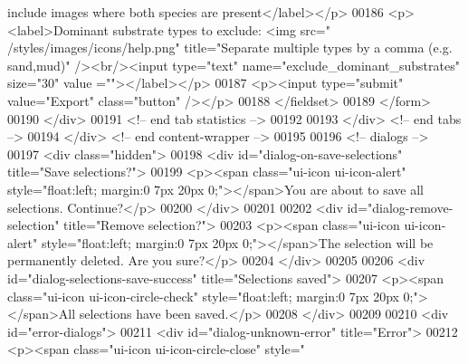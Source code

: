 \begin{DoxyCode}
      include images where both species are present</label></p>
00186                 <p><label>Dominant substrate types to exclude: <img src=\textcolor{stringliteral}{"
      /styles/images/icons/help.png"} title=\textcolor{stringliteral}{"Separate multiple types by a comma (e.g.
       sand,mud)"} /><br/><input type=\textcolor{stringliteral}{"text"} name=\textcolor{stringliteral}{"exclude\_dominant\_substrates"} size=\textcolor{stringliteral}{"30"} value
      =\textcolor{stringliteral}{""}></label></p>
00187                 <p><input type=\textcolor{stringliteral}{"submit"} value=\textcolor{stringliteral}{"Export"} \textcolor{keyword}{class}=\textcolor{stringliteral}{"button"} /></p>
00188             </fieldset>
00189             </form>
00190         </div>
00191         <!-- end tab statistics -->
00192 
00193     </div> <!-- end tabs -->
00194     </div> <!-- end content-wrapper -->
00195 
00196     <!-- dialogs -->
00197     <div \textcolor{keyword}{class}=\textcolor{stringliteral}{"hidden"}>
00198         <div \textcolor{keywordtype}{id}=\textcolor{stringliteral}{"dialog-on-save-selections"} title=\textcolor{stringliteral}{"Save selections?"}>
00199             <p><span \textcolor{keyword}{class}=\textcolor{stringliteral}{"ui-icon ui-icon-alert"} style=\textcolor{stringliteral}{"float:left; margin:0
       7px 20px 0;"}></span>You are about to save all selections. Continue?</p>
00200         </div>
00201 
00202         <div \textcolor{keywordtype}{id}=\textcolor{stringliteral}{"dialog-remove-selection"} title=\textcolor{stringliteral}{"Remove selection?"}>
00203             <p><span \textcolor{keyword}{class}=\textcolor{stringliteral}{"ui-icon ui-icon-alert"} style=\textcolor{stringliteral}{"float:left; margin:0
       7px 20px 0;"}></span>The selection will be permanently deleted. Are you sure?</p>
00204         </div>
00205 
00206         <div \textcolor{keywordtype}{id}=\textcolor{stringliteral}{"dialog-selections-save-success"} title=\textcolor{stringliteral}{"Selections saved"}>
00207             <p><span \textcolor{keyword}{class}=\textcolor{stringliteral}{"ui-icon ui-icon-circle-check"} style=\textcolor{stringliteral}{"float:left;
       margin:0 7px 20px 0;"}></span>All selections have been saved.</p>
00208         </div>
00209 
00210         <div \textcolor{keywordtype}{id}=\textcolor{stringliteral}{"error-dialogs"}>
00211             <div \textcolor{keywordtype}{id}=\textcolor{stringliteral}{"dialog-unknown-error"} title=\textcolor{stringliteral}{"Error"}>
00212                 <p><span \textcolor{keyword}{class}=\textcolor{stringliteral}{"ui-icon ui-icon-circle-close"} style=\textcolor{stringliteral}{"
}
\end{DoxyCode}
